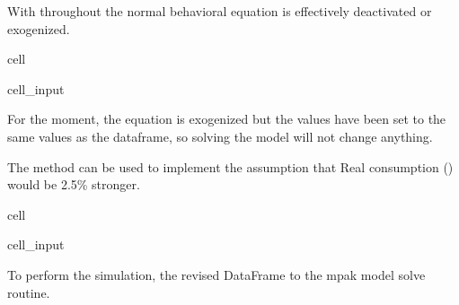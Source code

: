 \documentclass[letterpaper,10pt,english]{jupyterBook}
\begin{document}
\sphinxAtStartPar
With  throughout the normal behavioral equation is effectively de\sphinxhyphen{}activated or exogenized.

\begin{sphinxuseclass}{cell}\begin{sphinxVerbatimInput}

\begin{sphinxuseclass}{cell_input}
\begin{sphinxVerbatim}[commandchars=\\\{\}]
 
\end{sphinxVerbatim}

\end{sphinxuseclass}\end{sphinxVerbatimInput}

\end{sphinxuseclass}
\sphinxAtStartPar
For the moment, the equation is exogenized but the values have been set to the same values as the  dataframe, so solving the model will not change anything.

\sphinxAtStartPar
The  method can be used to implement the assumption that Real consumption () would be 2.5\% stronger.

\begin{sphinxuseclass}{cell}\begin{sphinxVerbatimInput}

\begin{sphinxuseclass}{cell_input}
\begin{sphinxVerbatim}[commandchars=\\\{\}]
\end{sphinxVerbatim}

\end{sphinxuseclass}\end{sphinxVerbatimInput}

\end{sphinxuseclass}
\sphinxAtStartPar
To perform the simulation, the revised  DataFrame to the mpak model solve routine.
\end{document}
